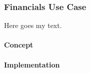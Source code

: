 \subsubsection{Financials Use Case}

Here goes my text.

\paragraph{Concept}
\paragraph{Implementation}